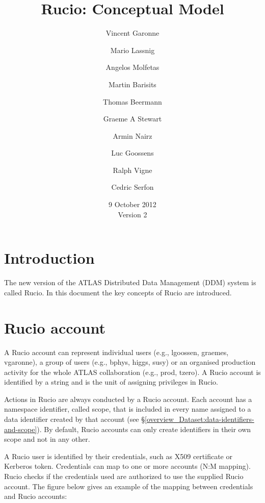 \documentclass{atlasnote}
\title{Rucio: Conceptual Model}
\author[1]{Vincent Garonne}
\author[1]{Mario Lassnig}
\author[1]{Angelos Molfetas}
\author[1]{Martin Barisits}
\author[1]{Thomas Beermann}
\author[1]{Graeme A Stewart}
\author[1]{Armin Nairz}
\author[1]{Luc Goossens}
\author[1]{Ralph Vigne}
\author[1]{Cedric Serfon}
\affil[1]{PH-ADP-CO, CERN}
\date{9 October 2012\\ Version 2}
\begin{document}
% 

\section{Introduction}


The new version of the ATLAS Distributed Data Management (DDM) system is called Rucio. In this document the key concepts of Rucio are introduced.

\section{Rucio account}
\label{overview_Rucio_account::doc}\label{overview_Rucio_account:rucio-account}

A Rucio account can represent individual users (e.g., lgoossen, graemes, vgaronne), a group of users (e.g., bphys, higgs, susy)
or an organised production activity for the whole ATLAS collaboration (e.g., prod, tzero). A Rucio account is identified by a
string and is the unit of assigning privileges in Rucio.


Actions in Rucio are always conducted by a Rucio account. Each account has a namespace identifier, called scope, that is
included in every name assigned to a data identifier created by that account (see \S\ref{overview_Dataset:data-identifiers-and-scope}).
By default, Rucio accounts can only create identifiers in their own scope and not in any other.


A Rucio user is identified by their credentials, such as X509 certificate or Kerberos token. Credentials can map to one or more accounts (N:M mapping).
Rucio checks if the credentials used are authorized to use the supplied Rucio account. The figure below gives an example of
the mapping between credentials and Rucio accounts:
\end{document}
